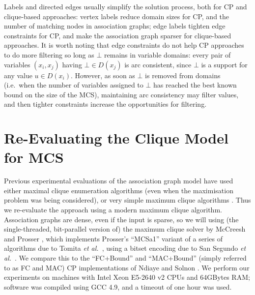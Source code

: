 \documentclass{llncs}
\begin{document}
Labels and directed edges usually simplify the solution process, both for CP and clique-based
approaches: vertex labels reduce domain sizes for CP, and the number of matching nodes in
association graphs; edge labels tighten edge constraints for CP, and make the association graph
sparser for clique-based approaches. It is worth noting that edge constraints do not help CP
approaches to do more filtering so long as $\bot$ remains in variable domains: every pair of
variables $(x_i, x_j)$ having  $\bot \in D(x_j)$ is arc consistent,
since $\bot$ is a support for any value $u \in D(x_i)$. However, as soon as $\bot$ is removed from
domains (i.e.\ when the number of variables assigned to $\bot$ has reached the best known bound on
the size of the MCS), maintaining arc consistency may filter values, and then tighter constraints
increase the opportunities for filtering.

\section{Re-Evaluating the Clique Model for MCS}\label{eval1}

Previous experimental evaluations of the association graph model have used either maximal clique
enumeration algorithms \cite{DBLP:journals/tcs/Koch01,DBLP:conf/mco/VismaraV08} (even when the
maximisation problem was being considered), or very simple maximum clique algorithms
\cite{DBLP:conf/sspr/BunkeFGSV02,DBLP:journals/jgaa/ConteFV07}. Thus we re-evaluate the approach
using a modern maximum clique algorithm. Association graphs are dense, even if the input is sparse,
so we will using (the single-threaded, bit-parallel version of) the maximum clique solver by
McCreesh and Prosser \cite{DBLP:journals/topc/McCreeshP15}, which implements Prosser's
\cite{DBLP:journals/algorithms/Prosser12} ``MCSa1'' variant of a series of algorithms due to Tomita
\textit{et al.}\
\cite{DBLP:conf/dmtcs/TomitaS03,DBLP:journals/jgo/TomitaK07,DBLP:conf/walcom/TomitaSHTW10}, using a
bitset encoding due to San Segundo \textit{et al.}\
\cite{DBLP:journals/cor/SegundoRJ11,DBLP:journals/ol/SegundoMRH13}. We compare this to the
``FC+Bound'' and ``MAC+Bound'' (simply referred to as FC and MAC) CP implementations of Ndiaye and
Solnon \cite{DBLP:conf/cp/NdiayeS11}.  We perform our experiments on machines with Intel Xeon
E5-2640 v2 CPUs and 64GBytes RAM; software was compiled using GCC 4.9, and a timeout of one hour was
used.
\end{document}
